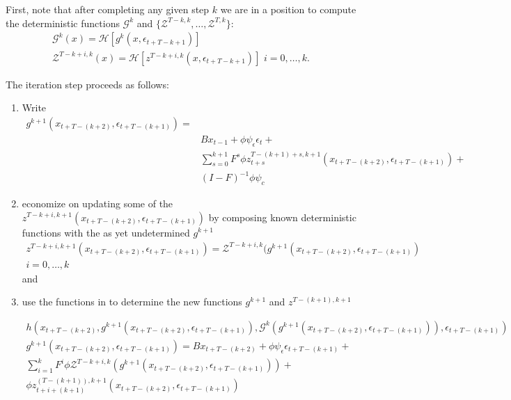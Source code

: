 \documentclass[12pt]{article}
\begin{document}
First, note that after completing any given step $k$
we  are in a position to compute the deterministic functions 
$\mathcal{G}^k$ and $\{\mathcal{Z}^{T-k,k},\ldots,\mathcal{Z}^{T,k}\}$:
\begin{gather}
   \mathcal{G}^{k}(x)= \mathcal{H}[g^{k}(x,\epsilon_{t+T-k+1})]\\
   \mathcal{Z}^{T-k+i,k}(x)= \mathcal{H}[z^{T-k+i,k}(x,\epsilon_{t+T-k+1})] \,\, i=0,\ldots,k. 
\end{gather} 

The iteration step proceeds as follows:

\begin{enumerate}
\item Write
\begin{align*}
g^{k+1}(x_{t+T-(k+2)},\epsilon_{t+T-(k+1)})=&\\
&B x_{t-1}+ \phi \psi_\epsilon\epsilon_t + \\
&\sum_{s=0}^{k+1} F^s \phi z^{T-(k+1)+s,k+1}_{t+s}(x_{t+T-(k+2)},\epsilon_{t+T-(k+1)}) +\\
& (I - F)^{-1} \phi \psi_c
\end{align*}
\item economize on updating some of
the $z^{T-k+i,k+1}(x_{t+T-(k+2)},\epsilon_{t+T-(k+1)})$ by composing known
deterministic functions with the as yet undetermined $g^{k+1}$
\begin{gather}
z^{T-k+i,k+1}(x_{t+T-(k+2)},\epsilon_{t+T-(k+1)})= \mathcal{Z}^{T-k+i,k}(g^{k+1}(x_{t+T-(k+2)},\epsilon_{t+T-(k+1)}) \,\, \\i=0,\ldots,k  
\end{gather}
 and
\item  use the functions in  to determine the new functions 
 $g^{k+1}$  and  $z^{T-(k+1),k+1}$ %


\begin{gather}
 h(x_{t+T-(k+2)},g^{k+1}(x_{t+T-(k+2)},\epsilon_{t+T-(k+1)}), \mathcal{G}^{k}(g^{k+1}(x_{t+T-(k+2)},\epsilon_{t+T-(k+1)})),\epsilon_{t+T-(k+1)})\\ \label{iterSys}
 g^{k+1}(x_{t+T-(k+2)},\epsilon_{t+T-(k+1)})= 
 B x_{t+T-(k+2)}+ \phi \psi_\epsilon\epsilon_{t+T-(k+1)} +\\
\sum_{i=1}^k F^i \phi \mathcal{Z}^{T-k+i,k}(g^{k+1}(x_{t+T-(k+2)},\epsilon_{t+T-(k+1)})) +\\
 \phi z^{(T-(k+1)),k+1}_{t+i+(k+1)}(x_{t+T-(k+2)},\epsilon_{t+T-(k+1)})\\
   \end{gather}
\end{enumerate}
\end{document}
